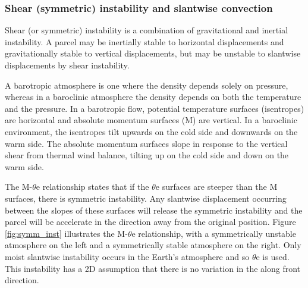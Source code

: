 \subsubsection {Shear (symmetric) instability and slantwise convection}

Shear (or symmetric) instability is a combination of gravitational and inertial instability. A parcel may be inertially stable to horizontal displacements and gravitationally stable to vertical displacements, but may be unstable to slantwise displacements by shear instability. 

A barotropic atmosphere is one where the density depends solely on pressure, whereas in a baroclinic atmosphere the density depends on both the temperature and the pressure. In a barotropic flow, potential temperature surfaces (isentropes) are horizontal and absolute momentum surfaces (M) are vertical. In a baroclinic environment, the isentropes tilt upwards on the cold side and downwards on the warm side. The absolute momentum surfaces slope in response to the vertical shear from thermal wind balance, tilting up on the cold side and down on the warm side.
%

The  M-$\theta$e relationship states that if the $\theta$e surfaces are steeper than the M surfaces, there is symmetric instability. Any slantwise displacement occurring between the slopes of these surfaces will release the symmetric instability and the parcel will be accelerate in the direction away from the original position. Figure \ref{fig:symm_inst} illustrates the M-$\theta$e relationship, with a symmetrically unstable atmosphere on the left and a symmetrically stable atmosphere on the right. Only moist slantwise instability occurs in the Earth's atmosphere \cite{bennetts1979conditional} and so $\theta$e is used. This instability has a 2D assumption that there is no variation in the along front direction. 


